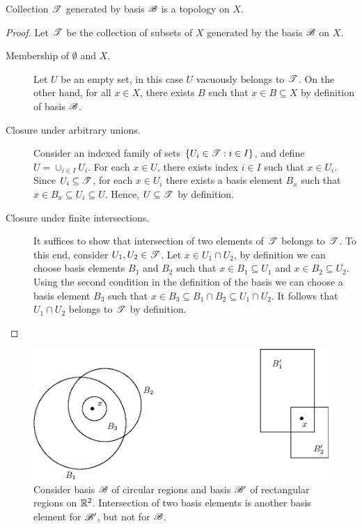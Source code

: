 \documentclass[a4paper,english,12pt]{article}   	%
\begin{document}
\begin{lem} Collection $\mathscr{T}$ generated by basis $\mathscr{B}$ is a topology on $X$. 
\end{lem}
\begin{proof} Let $\mathscr{T}$ be the collection of subsets of $X$ generated by the basis $\mathscr{B}$ on $X$. 
	\begin{description}
		\item[Membership of $\emptyset$ and $X$.] Let $U$ be an empty set, in this case $U$ vacuously belongs to $\mathscr{T}$. On the other hand, for all $x \in X$, there exists $B$ such that $x \in B \subseteq X$ by definition of basis $\mathscr{B}$. 
		\item[Closure under arbitrary unions.] Consider an indexed family of sets $\{U_i \in \mathscr{T}: i \in I\}$, and define $U = \cup_{i \in I}U_i$. For each $x \in U$, there exists index $i \in I$ such that $x \in U_i$. Since $U_i \subseteq \mathscr{T}$, for each $x \in U_i$ there exists a basis element $B_x$ such that $x \in B_x \subseteq U_i \subseteq U$. Hence, $U \subseteq \mathscr{T}$ by definition.
		\item[Closure under finite intersections.]  It suffices to show that intersection of two elements of $\mathscr{T}$ belongs to $\mathscr{T}$. To this end, consider  $U_1, U_2 \in \mathscr{T}$. Let $x \in U_1 \cap U_2$, by definition we can choose basis elements $B_1$ and $B_2$ such that $x \in B_1 \subseteq U_1$ and $x \in B_2 \subseteq U_2$. Using the second condition in the definition of the basis we can choose a basis element $B_3$ such that $x \in B_3 \subseteq B_1\cap B_2 \subseteq U_1 \cap U_2$. It follows that $U_1 \cap U_2$ belongs to $\mathscr{T}$ by definition. %
	\end{description}
\end{proof}
 
\begin{figure}[hhhh]
 \centering
 \includegraphics[width=\textwidth]{fig134.eps}
	\caption{Consider basis $\mathscr{B}$ of circular regions and basis $\mathscr{B}'$ of rectangular regions on $\mathbb{R}^2$. Intersection of two basis elements is another basis element for $\mathscr{B}'$, but not for $\mathscr{B}$.}
	\label{Fig:ExampleCircularBasis}
\end{figure}
\end{document}
